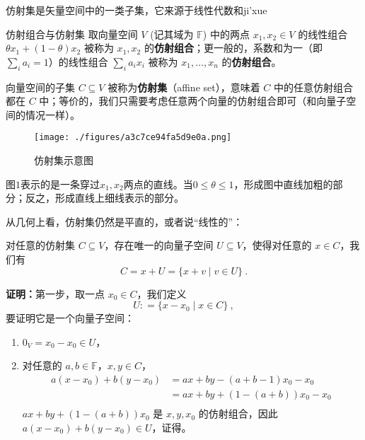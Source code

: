 
\begin{issues}
\issueTODO
\end{issues}


仿射集是矢量空间中的一类子集，它来源于线性代数和ji'xue

\begin{definition}{仿射组合与仿射集}\label{def_AffSet_1}
取向量空间 $V$ (记其域为 $\mathbb{F}$) 中的两点 $x_1, x_2 \in V$ 的线性组合 $\theta x_1 + (1 - \theta) x_2$ 被称为 $x_1, x_2$ 的\textbf{仿射组合}；更一般的，系数和为一（即$\sum_i a_i = 1$）的线性组合 $\sum_i a_i x_i$ 被称为 $x_1, \dots, x_n$ 的\textbf{仿射组合}。

向量空间的子集 $C \subseteq V$ 被称为\textbf{仿射集}（affine set），意味着 $C$ 中的任意仿射组合都在 $C$ 中；等价的，我们只需要考虑任意两个向量的仿射组合即可（和向量子空间的情况一样）。
\end{definition}

\begin{figure}[ht]
\centering
\texttt{[image: ./figures/a3c7ce94fa5d9e0a.png]}
\caption{仿射集示意图} \label{fig_AffSet_1}
\end{figure}

图$1$表示的是一条穿过$x_1,x_2$两点的直线。当$0 \leq \theta \leq 1$，形成图中直线加粗的部分；反之，形成直线上细线表示的部分。

从几何上看，仿射集仍然是平直的，或者说“线性的”：

\begin{theorem}{}
对任意的仿射集 $C \subseteq V$，存在唯一的向量子空间 $U \subseteq V$，使得对任意的 $x \in C$，我们有
\begin{equation}
C = x + U = \{ x + v \mid v \in U\}~.
\end{equation}
\end{theorem}

\textbf{证明：}第一步，取一点 $x_0 \in C$，我们定义
\begin{equation}
U: = \{ x - x_0 \mid x \in C \}~,
\end{equation}
要证明它是一个向量子空间：
\begin{enumerate}
\item $0_V = x_0 - x_0 \in U$，
\item 对任意的 $a, b \in \mathbb{F}$，$x, y \in C$，
    \begin{equation}
    \begin{aligned}
    a (x - x_0) + b (y - x_0) &= a x + b y - (a + b - 1) x_0 - x_0 \\
    &= a x + b y + (1 - (a + b)) x_0 - x_0 \\
    \end{aligned}~
    \end{equation}
$a x + b y + (1 - (a + b)) x_0$ 是 $x, y, x_0$ 的仿射组合，因此 $a (x - x_0) + b (y - x_0) \in U$，证得。
\end{enumerate}

